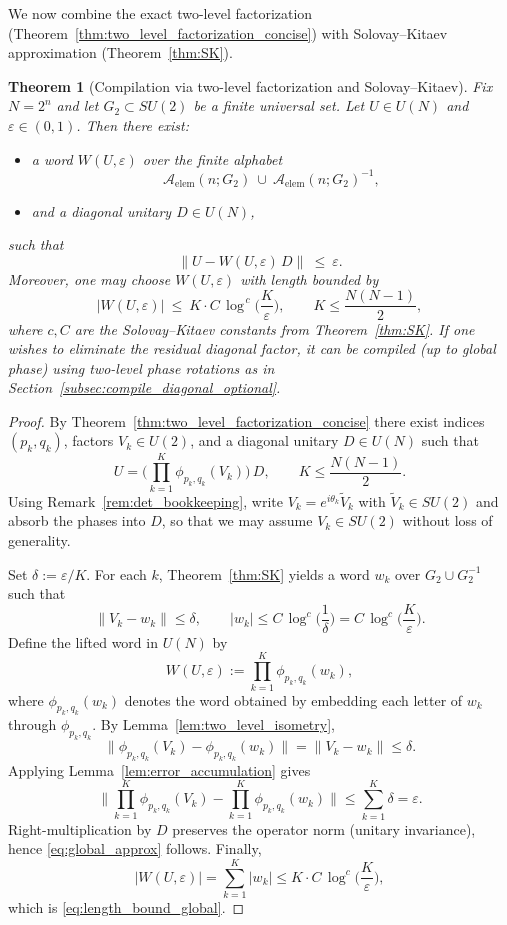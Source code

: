 \documentclass{article}%
\newtheorem{theorem}{Theorem}[section]
\theoremstyle{definition}
\numberwithin{equation}{section}
\begin{document}
We now combine the exact two-level factorization (Theorem~\ref{thm:two_level_factorization_concise}) with Solovay--Kitaev approximation
(Theorem~\ref{thm:SK}).

\begin{theorem}[Compilation via two-level factorization and Solovay--Kitaev]
\label{thm:UN_compilation_SK}
Fix $N=2^n$ and let $G_2\subset SU(2)$ be a finite universal set.
Let $U\in U(N)$ and $\varepsilon\in(0,1)$. Then there exist:
\begin{itemize}
\item a word $W(U,\varepsilon)$ over the finite alphabet
\[
\mathcal{A}_{\mathrm{elem}}(n;G_2)\ \cup\ \mathcal{A}_{\mathrm{elem}}(n;G_2)^{-1},
\]
\item and a diagonal unitary $D\in U(N)$,
\end{itemize}
such that
\begin{equation}\label{eq:global_approx}
\big\|U - W(U,\varepsilon)\,D\big\|\ \le\ \varepsilon.
\end{equation}
Moreover, one may choose $W(U,\varepsilon)$ with length bounded by
\begin{equation}\label{eq:length_bound_global}
|W(U,\varepsilon)|\ \le\ K\cdot C\,\log^{\,c}\!\Big(\frac{K}{\varepsilon}\Big),
\qquad
K\le \frac{N(N-1)}{2},
\end{equation}
where $c,C$ are the Solovay--Kitaev constants from Theorem~\ref{thm:SK}.
If one wishes to eliminate the residual diagonal factor, it can be compiled (up to global phase) using two-level phase rotations as in
Section~\ref{subsec:compile_diagonal_optional}.
\end{theorem}

\begin{proof}
By Theorem~\ref{thm:two_level_factorization_concise} there exist indices $(p_k,q_k)$, factors $V_k\in U(2)$, and a diagonal unitary $D\in U(N)$
such that
\[
U=\Big(\prod_{k=1}^K \phi_{p_k,q_k}(V_k)\Big)\,D,
\qquad
K\le \frac{N(N-1)}{2}.
\]
Using Remark~\ref{rem:det_bookkeeping}, write $V_k=e^{i\theta_k}\widetilde V_k$ with $\widetilde V_k\in SU(2)$ and absorb the phases
into $D$, so that we may assume $V_k\in SU(2)$ without loss of generality.

Set $\delta:=\varepsilon/K$. For each $k$, Theorem~\ref{thm:SK} yields a word $w_k$ over $G_2\cup G_2^{-1}$ such that
\[
\|V_k-w_k\|\le \delta,
\qquad
|w_k|\le C\,\log^{c}\!\Big(\frac{1}{\delta}\Big)=C\,\log^{c}\!\Big(\frac{K}{\varepsilon}\Big).
\]
Define the lifted word in $U(N)$ by
\[
W(U,\varepsilon):=\prod_{k=1}^K \phi_{p_k,q_k}(w_k),
\]
where $\phi_{p_k,q_k}(w_k)$ denotes the word obtained by embedding each letter of $w_k$ through $\phi_{p_k,q_k}$.
By Lemma~\ref{lem:two_level_isometry},
\[
\big\|\phi_{p_k,q_k}(V_k)-\phi_{p_k,q_k}(w_k)\big\|
=
\|V_k-w_k\|
\le \delta.
\]
Applying Lemma~\ref{lem:error_accumulation} gives
\[
\Big\|\prod_{k=1}^K\phi_{p_k,q_k}(V_k)-\prod_{k=1}^K\phi_{p_k,q_k}(w_k)\Big\|
\le
\sum_{k=1}^K \delta
=
\varepsilon.
\]
Right-multiplication by $D$ preserves the operator norm (unitary invariance), hence \eqref{eq:global_approx} follows.
Finally,
\[
|W(U,\varepsilon)|
=\sum_{k=1}^K |w_k|
\le
K\cdot C\,\log^{c}\!\Big(\frac{K}{\varepsilon}\Big),
\]
which is \eqref{eq:length_bound_global}.
\end{proof}
\end{document}
